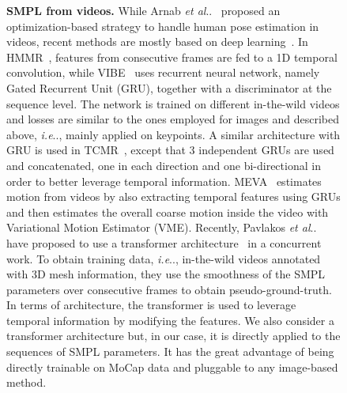 \documentclass[10pt,twocolumn,letterpaper]{article}
\makeatletter
\DeclareRobustCommand\onedot{\futurelet\@let@token\@onedot}
\def\@onedot{\ifx\@let@token.\else.\null\fi\xspace}
\def\ie{\emph{i.e}\onedot} \def\Ie{\emph{I.e}\onedot}
\def\etal{\emph{et al}\onedot}
\renewcommand{\paragraph}[1]{\vspace{0.02cm}\noindent\textbf{#1}}
\makeatother
\begin{document}
\begin{figure}
\paragraph{SMPL from videos.}
While Arnab \etal~\cite{videokinetics} proposed an optimization-based strategy to handle human pose estimation in videos, recent methods are mostly based on deep learning~\cite{vibe,thmmr,Jiang_2021_CVPR}.
In HMMR~\cite{hmmr}, features from consecutive frames are fed to a 1D temporal convolution, while VIBE~\cite{vibe} uses recurrent neural network, namely Gated Recurrent Unit (GRU), together with a discriminator at the sequence level.
The network is trained on different in-the-wild videos and losses are similar to the ones employed for images and described above, \ie, mainly applied on keypoints.
A similar architecture with GRU is used in TCMR~\cite{tcmr}, except that 3 independent GRUs are used and concatenated, one in each direction and one bi-directional in order to better leverage temporal information.
MEVA~\cite{meva} estimates motion from videos by  also extracting temporal features using GRUs and then estimates the overall coarse motion inside the video with Variational Motion Estimator (VME).
Recently, Pavlakos \etal~\cite{thmmr} have proposed to use a transformer architecture~\cite{transformer} in a concurrent work.
To obtain training data, \ie, in-the-wild videos annotated with 3D mesh information, they use the smoothness of the SMPL parameters over consecutive frames to obtain pseudo-ground-truth. In terms of architecture, the transformer is used to leverage temporal information by modifying the features.
We also consider a transformer architecture but, in our case, it is directly applied to the sequences of SMPL parameters. It has the great advantage of being directly trainable on MoCap data and pluggable to any image-based method.
 


\end{figure}
\end{document}
